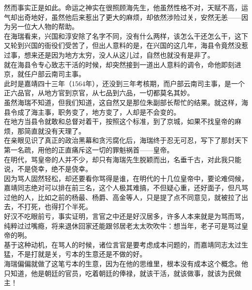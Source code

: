 \begin{multicols}{\theparacolNo}
然而事实正是如此。命运之神实在很照顾海先生，他虽然性格不对，天赋不高，运气却出奇地好，虽然他后来惹出了更大的麻烦，却依然涉险过关，安然无恙——因为另一位大人物的帮助。\\

在海瑞看来，兴国和淳安除了名字不同，没有什么两样，该怎么干还怎么干，这下又轮到兴国的衙役们受苦了，但出人意料的是，在兴国的这几年，海县令竟然没惹过事，想来还是因为地方太穷，没人从这儿过，自然也就没有是非了。\\

就在海县令专心致志干活的时候，却突然接到一道出人意料的调令，命他即刻进京，就任户部云南司主事。\\

此时是嘉靖四十三年（1564年），还没到三年考核期，而户部云南司主事，是一个正六品官，从地方官到京官，从七品到六品，一切都莫名其妙。\\

虽然海瑞不知道，但我们知道，这自然又是那位朱副部长帮忙的结果。就这样，海县令成了海主事，职务变了，地方变了，人却是不会变的。\\

在地方当县令就敢和总督对着干，按照这个标准，到了京城，如果不找皇帝的麻烦，那简直就没有天理了。\\

在亲眼见识了真正的政治黑幕和贪污腐化后，海瑞终于忍无可忍，写下了那封天下第一名疏，用他的正直痛斥这一切的罪魁祸首——皇帝。\\

在明代，骂皇帝的人并不少，却只有海瑞先生脱颖而出，名垂千古，对此我只能说，不是侥幸，绝不是侥幸。\\

因为骂人固然轻松，却还要看你骂得是谁，在明代的十几位皇帝中，要论难伺候，嘉靖同志绝对可以排在前三名，这个人极其难搞，不但疑心重，还好面子，但凡骂过他的人，比如之前的杨最、杨爵、高金等人，只是提了点不同意见，就被拉了出去，不打死，也得打个半死。\\

好汉不吃眼前亏，事实证明，言官之中还是好汉居多，许多人本来就是为骂而骂，纯粹过过嘴瘾，将来退休回家还能跟邻居老太太吹吹牛：想当年，老子可是骂过皇帝的咧。\\

基于这种动机，在骂人的时候，诸位言官是要考虑成本问题的，而嘉靖同志太过生猛，不是打就是关，亏本的生意还是不做的好。\\

海瑞偏偏就做了这笔亏本的生意，因为在他的思维里，根本没有成本这个概念。他只知道，他是朝廷的官员，吃着朝廷的俸禄，就该干活，就该做事，就该为民做主！\\


\end{multicols}
